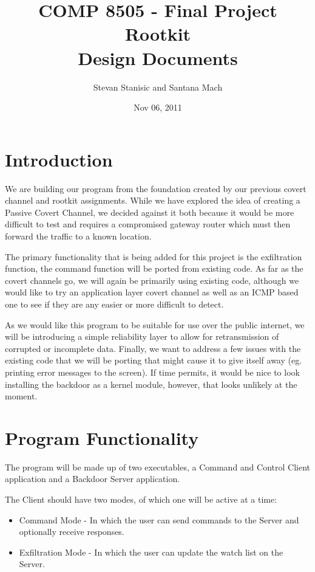 \documentclass[titlepage]{article}
\begin{document}
\author{Stevan Stanisic and Santana Mach}
\title{COMP 8505 - Final Project \\ Rootkit \\ Design Documents}
\date{Nov 06, 2011}
\maketitle{}

\tableofcontents
\pagebreak

\section{Introduction}

We are building our program from the foundation created by our previous covert channel and rootkit assignments. While we have explored the idea of creating a Passive Covert
Channel, we decided against it both because it would be more difficult to test and requires a compromised gateway router which must then forward the traffic to a known location.

The primary functionality that is being added for this project is the exfiltration function, the command function will be ported from existing code. As far as the covert channels go, we will again be primarily using existing code, although we would like to try an application layer covert channel as well as an ICMP based one to see if they are any easier or more difficult to detect.

As we would like this program to be suitable for use over the public internet, we will be introducing a simple reliability layer to allow for retransmission of corrupted or incomplete data.
Finally, we want to address a few issues with the existing code that we will be porting that might cause it to give itself away (eg. printing error messages to the screen). If time permits,
it would be nice to look installing the backdoor as a kernel module, however, that looks unlikely at the moment.

\section{Program Functionality}

The program will be made up of two executables, a Command and Control Client application and a Backdoor Server application.

The Client should have two modes, of which one will be active at a time:
\begin{itemize}
  \item Command Mode - In which the user can send commands to the Server and optionally receive responses.
  \item Exfiltration Mode - In which the user can update the watch list on the Server.
\end{itemize}
\end{document}
